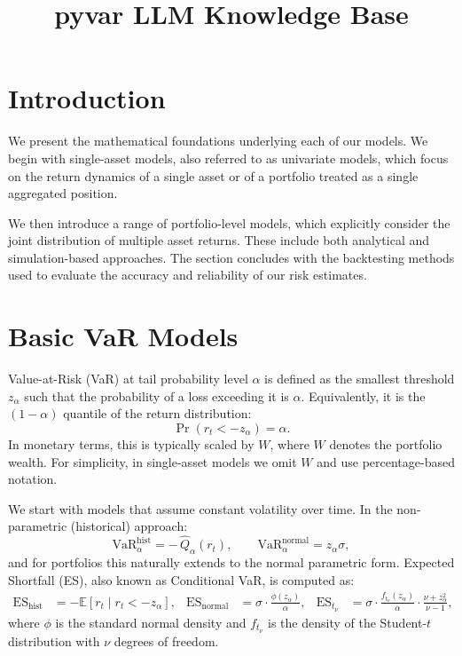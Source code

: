 \documentclass[12pt]{article}
\title{\textbf{pyvar LLM Knowledge Base}}
\author{}
\date{}
\begin{document}
\maketitle
\tableofcontents
\newpage

\section{Introduction}

We present the mathematical foundations underlying each of our models. We begin with single-asset models, also referred to as univariate models, which focus on the return dynamics of a single asset or of a portfolio treated as a single aggregated position.

We then introduce a range of portfolio-level models, which explicitly consider the joint distribution of multiple asset returns. These include both analytical and simulation-based approaches. The section concludes with the backtesting methods used to evaluate the accuracy and reliability of our risk estimates.


\section{Basic VaR Models}

Value-at-Risk (VaR) at tail probability level $\alpha$ is defined as the smallest threshold $z_{\alpha}$ such that the probability of a loss exceeding it is $\alpha$. Equivalently, it is the $(1 - \alpha)$ quantile of the return distribution:
\[
\Pr\left(r_t < -z_{\alpha}\right) = \alpha.
\]
In monetary terms, this is typically scaled by \( W \), where \( W \) denotes the portfolio wealth. For simplicity, in single-asset models we omit \( W \) and use percentage-based notation.

We start with models that assume constant volatility over time. In the non-parametric (historical) approach:
\[
\mathrm{VaR}_{\alpha}^{\mathrm{hist}} = -\,\widehat{Q}_{\alpha}(r_t), \qquad
\mathrm{VaR}_{\alpha}^{\mathrm{normal}} = z_{\alpha} \sigma,
\]
and for portfolios this naturally extends to the normal parametric form. Expected Shortfall (ES), also known as Conditional VaR, is computed as:
\[
\begin{aligned}
\mathrm{ES}_{\mathrm{hist}} &= -\mathbb{E}\left[r_t \mid r_t < -z_{\alpha}\right], &
\mathrm{ES}_{\mathrm{normal}} &= \sigma \cdot \frac{\phi(z_{\alpha})}{\alpha}, &
\mathrm{ES}_{t_\nu} &= \sigma \cdot \frac{f_{t_\nu}(z_{\alpha})}{\alpha} \cdot \frac{\nu + z_{\alpha}^2}{\nu - 1},
\end{aligned}
\]
where $\phi$ is the standard normal density and $f_{t_\nu}$ is the density of the Student-$t$ distribution with $\nu$ degrees of freedom.
\end{document}
